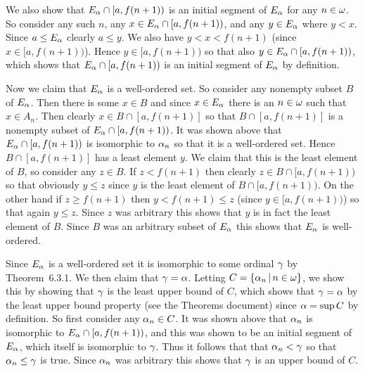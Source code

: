 \begin{solution}
{        We also show that $E_\alpha \cap [a, f(n+1))$ is an initial segment of $E_\alpha$ for any $n \in \omega$.
        So consider any such $n$, any $x \in E_\alpha \cap [a, f(n+1))$, and any $y \in E_\alpha$ where $y < x$.
        Since $a \leq E_\alpha$ clearly $a \leq y$.
        We also have $y < x < f(n+1)$ (since $x \in [a, f(n+1))$).
        Hence $y \in [a, f(n+1))$ so that also $y \in E_\alpha \cap [a, f(n+1))$, which shows that $E_\alpha \cap [a, f(n+1))$ is an initial segment of $E_\alpha$ by definition.

        Now we claim that $E_\alpha$ is a well-ordered set.
        So consider any nonempty subset $B$ of $E_\alpha$.
        Then there is some $x \in B$ and since $x \in E_\alpha$ there is an $n \in \omega$ such that $x \in A_n$.
        Then clearly $x \in B \cap [a, f(n+1)]$ so that $B \cap [a, f(n+1)]$ is a nonempty subset of $E_\alpha \cap [a, f(n+1))$.
        It was shown above that $E_\alpha \cap [a, f(n+1))$ is isomorphic to $\alpha_n$ so that it is a well-ordered set.
        Hence $B \cap [a, f(n+1)]$ has a least element $y$.
        We claim that this is the least element of $B$, so consider any $z \in B$.
        If $z < f(n+1)$ then clearly $z \in B \cap [a, f(n+1))$ so that obviously $y \leq z$ since $y$ is the least element of $B \cap [a, f(n+1))$.
        On the other hand if $z \geq f(n+1)$ then $y < f(n+1) \leq z$ (since $y \in [a, f(n+1))$) so that again $y \leq z$.
        Since $z$ was arbitrary this shows that $y$ is in fact the least element of $B$.
        Since $B$ was an arbitrary subset of $E_\alpha$ this shows that $E_\alpha$ is well-ordered.

        Since $E_\alpha$ is a well-ordered set it is isomorphic to some ordinal $\gamma$ by Theorem~6.3.1.
        We then claim that $\gamma = \alpha$.
        Letting $C = \left\{ \alpha_n \,|\, n \in \omega \right\}$, we show this by showing that $\gamma$ is the least upper bound of $C$, which shows that $\gamma = \alpha$ by the least upper bound property (see the Theorems document) since $\alpha = \sup{C}$ by definition.
        So first consider any $\alpha_n \in C$.
        It was shown above that $\alpha_n$ is isomorphic to $E_\alpha \cap [a, f(n+1))$, and this was shown to be an initial segment of $E_\alpha$, which itself is isomorphic to $\gamma$.
        Thus it follows that that $\alpha_n < \gamma$ so that $\alpha_n \leq \gamma$ is true.
        Since $\alpha_n$ was arbitrary this shows that $\gamma$ is an upper bound of $C$.

}
\end{solution}
